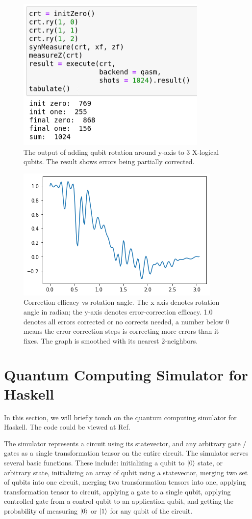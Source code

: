 \documentclass{article}
\begin{document}
\begin{figure}[h]
    \centering
    \includegraphics[width = 0.5\linewidth]{surface/ry-xl.PNG}
    \caption{The output of adding qubit rotation around y-axis to 3 X-logical qubits. The result shows errors being partially corrected.}
    \label{fig:my_label}
\end{figure}

\begin{figure}[h]
    \centering
    \includegraphics[width = 0.6\linewidth]{surface/efficacy_smoothed.png}
    \caption{Correction efficacy vs rotation angle. The x-axis denotes rotation angle in radian; the y-axis denotes error-correction efficacy. 1.0 denotes all errors corrected or no corrects needed, a number below 0 means the error-correction steps is correcting more errors than it fixes. The graph is smoothed with its nearest 2-neighbors.}
    \label{fig:my_label}
\end{figure}

\newpage
\section{Quantum Computing Simulator for Haskell}
In this section, we will briefly touch on the quantum computing simulator for Haskell. The code could be viewed at Ref.\cite{yanjunQaskell2021}

The simulator represents a circuit using its statevector, and any arbitrary gate / gates as a single transformation tensor on the entire circuit. The simulator serves several basic functions. These include: initializing a qubit to $\ket{0}$ state, or arbitrary state, initializing an array of qubit using a statevector, merging two set of qubits into one circuit, merging two transformation tensors into one, applying transformation tensor to circuit, applying a gate to a single qubit, applying controlled gate from a control qubit to an application qubit, and getting the probability of measuring $\ket{0}$ or $\ket{1}$ for any qubit of the circuit.
\end{document}
